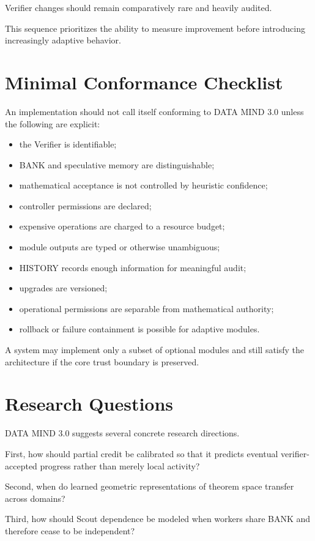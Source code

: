 \documentclass[11pt]{article}
\begin{document}
Verifier changes should remain comparatively rare and heavily audited.

This sequence prioritizes the ability to measure improvement before introducing increasingly adaptive behavior.

\section{Minimal Conformance Checklist}

An implementation should not call itself conforming to DATA MIND 3.0 unless the following are explicit:
\begin{itemize}
\item the Verifier is identifiable;
\item BANK and speculative memory are distinguishable;
\item mathematical acceptance is not controlled by heuristic confidence;
\item controller permissions are declared;
\item expensive operations are charged to a resource budget;
\item module outputs are typed or otherwise unambiguous;
\item HISTORY records enough information for meaningful audit;
\item upgrades are versioned;
\item operational permissions are separable from mathematical authority;
\item rollback or failure containment is possible for adaptive modules.
\end{itemize}

A system may implement only a subset of optional modules and still satisfy the architecture if the core trust boundary is preserved.

\section{Research Questions}

DATA MIND 3.0 suggests several concrete research directions.

First, how should partial credit be calibrated so that it predicts eventual verifier-accepted progress rather than merely local activity?

Second, when do learned geometric representations of theorem space transfer across domains?

Third, how should Scout dependence be modeled when workers share BANK and therefore cease to be independent?
\end{document}
